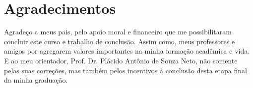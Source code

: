 
\chapter*{Agradecimentos}

Agradeço a meus pais, pelo apoio moral e financeiro que me possibilitaram concluir este curso e trabalho de conclusão. Assim como, meus professores e amigos por agregarem valores importantes na minha formação acadêmica e vida. E ao meu orientador, Prof. Dr. Plácido Antônio de Souza Neto, não somente pelas suas correções, mas também pelos incentivos à conclusão desta etapa final da minha graduação.
